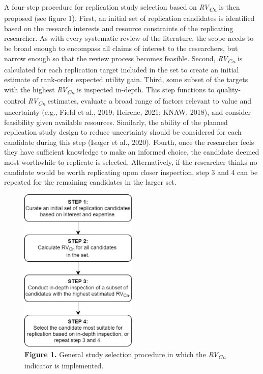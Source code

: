 \documentclass[
  english,
  man,floatsintext]{apa6}
\begin{document}
A four-step procedure for replication study selection based on \emph{RV\textsubscript{Cn}} is then proposed (see figure 1). First, an initial set of replication candidates is identified based on the research interests and resource constraints of the replicating researcher. As with every systematic review of the literature, the scope needs to be broad enough to encompass all claims of interest to the researchers, but narrow enough so that the review process becomes feasible. Second, \emph{RV\textsubscript{Cn}} is calculated for each replication target included in the set to create an initial estimate of rank-order expected utility gain. Third, some subset of the targets with the highest \emph{RV\textsubscript{Cn}} is inspected in-depth. This step functions to quality-control \emph{RV\textsubscript{Cn}} estimates, evaluate a broad range of factors relevant to value and uncertainty (e.g., Field et al., 2019; Heirene, 2021; KNAW, 2018), and consider feasibility given available resources. Similarly, the ability of the planned replication study design to reduce uncertainty should be considered for each candidate during this step (Isager et al., 2020). Fourth, once the researcher feels they have sufficient knowledge to make an informed choice, the candidate deemed most worthwhile to replicate is selected. Alternatively, if the researcher thinks no candidate would be worth replicating upon closer inspection, step 3 and 4 can be repeated for the remaining candidates in the larger set.

\begin{figure}
\centering
\includegraphics[width=0.5\textwidth,height=\textheight]{Figure_1.png}
\caption{\textbf{Figure 1.} General study selection procedure in which the \emph{RV\textsubscript{Cn}} indicator is implemented.}
\end{figure}
\end{document}
